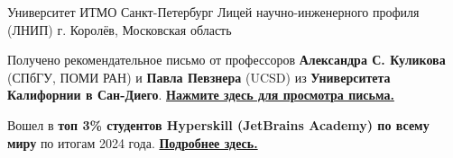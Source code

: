 \documentclass[10pt]{developercv} %
\begin{document}


\begin{entrylist}
	\entry
		{} %
		{Университет ИТМО} %
		{Санкт-Петербург}
		{} %
	\entry
		{} %
		{Лицей научно-инженерного профиля (ЛНИП)} %
		{г. Королёв, Московская область} %
		{} %
\end{entrylist}



Получено рекомендательное письмо от профессоров \textbf{Александра С. Куликова} (СПбГУ, ПОМИ РАН) и \textbf{Павла Певзнера} (UCSD) из \textbf{Университета Калифорнии в Сан-Диего}.
\href{https://github.com/gs0xa19f2/gs0xa19f2/blob/main/Рекомендательное%20письмо%20UCSD.pdf}{\textbf{Нажмите здесь для просмотра письма.}}

\vspace{0.3cm} %

Вошел в \textbf{топ 3\% студентов Hyperskill (JetBrains Academy) по всему миру} по итогам 2024 года.
\href{https://hyperskill.org/wrapped/year-2024/398153840?utm_source=wrapped_hs&utm_medium=social&utm_campaign=newyear_wrapped2024}{\textbf{Подробнее здесь.}} %

\end{document}
